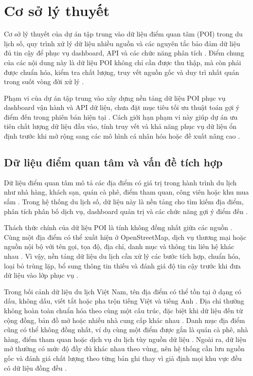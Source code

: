 \section{Cơ sở lý thuyết}

Cơ sở lý thuyết của dự án tập trung vào dữ liệu điểm quan tâm (POI) trong du lịch số, quy trình xử lý dữ liệu nhiều nguồn và các nguyên tắc bảo đảm dữ liệu đủ tin cậy để phục vụ dashboard, API và các chức năng phân tích \cite{zhang2023}. Điểm chung của các nội dung này là dữ liệu POI không chỉ cần được thu thập, mà còn phải được chuẩn hóa, kiểm tra chất lượng, truy vết nguồn gốc và duy trì nhất quán trong suốt vòng đời xử lý \cite{ibmDataQuality}.\par

Phạm vi của dự án tập trung vào xây dựng nền tảng dữ liệu POI phục vụ dashboard vận hành và API dữ liệu, chưa đặt mục tiêu tối ưu thuật toán gợi ý điểm đến trong phiên bản hiện tại \cite{zhang2023}. Cách giới hạn phạm vi này giúp dự án ưu tiên chất lượng dữ liệu đầu vào, tính truy vết và khả năng phục vụ dữ liệu ổn định trước khi mở rộng sang các mô hình cá nhân hóa hoặc đề xuất nâng cao \cite{ibmDataQuality}.\par

\subsection{Dữ liệu điểm quan tâm và vấn đề tích hợp}

Dữ liệu điểm quan tâm mô tả các địa điểm có giá trị trong hành trình du lịch như nhà hàng, khách sạn, quán cà phê, điểm tham quan, công viên hoặc khu mua sắm \cite{zhang2023}. Trong hệ thống du lịch số, dữ liệu này là nền tảng cho tìm kiếm địa điểm, phân tích phân bố dịch vụ, dashboard quản trị và các chức năng gợi ý điểm đến \cite{zhang2023}.\par

Thách thức chính của dữ liệu POI là tính không đồng nhất giữa các nguồn \cite{yeboah2021}. Cùng một địa điểm có thể xuất hiện ở OpenStreetMap, dịch vụ thương mại hoặc nguồn nội bộ với tên gọi, tọa độ, địa chỉ, danh mục và thông tin liên hệ khác nhau \cite{yeboah2021}. Vì vậy, nền tảng dữ liệu du lịch cần xử lý các bước tích hợp, chuẩn hóa, loại bỏ trùng lặp, bổ sung thông tin thiếu và đánh giá độ tin cậy trước khi đưa dữ liệu vào lớp phục vụ \cite{ibmDataQuality}.\par

Trong bối cảnh dữ liệu du lịch Việt Nam, tên địa điểm có thể tồn tại ở dạng có dấu, không dấu, viết tắt hoặc pha trộn tiếng Việt và tiếng Anh \cite{yeboah2021}. Địa chỉ thường không hoàn toàn chuẩn hóa theo cùng một cấu trúc, đặc biệt khi dữ liệu đến từ cộng đồng, bản đồ mở hoặc nhiều nhà cung cấp khác nhau \cite{yeboah2021}. Danh mục địa điểm cũng có thể không đồng nhất, ví dụ cùng một điểm được gắn là quán cà phê, nhà hàng, điểm tham quan hoặc dịch vụ du lịch tùy nguồn dữ liệu \cite{zhang2023}. Ngoài ra, dữ liệu mở thường có mức độ đầy đủ khác nhau theo vùng, nên hệ thống cần lưu nguồn gốc và đánh giá chất lượng theo từng bản ghi thay vì giả định mọi khu vực đều có dữ liệu đồng đều \cite{yeboah2021}.\par

